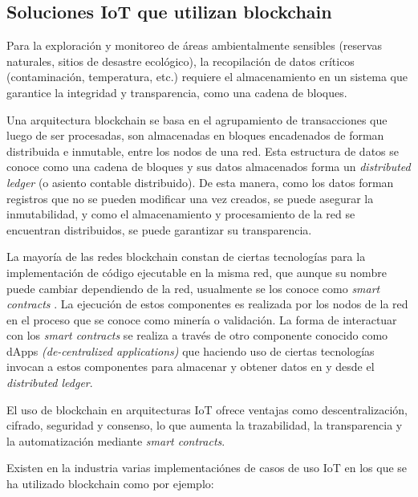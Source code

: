 \subsection{Soluciones IoT que utilizan blockchain}


Para la exploración y monitoreo de áreas ambientalmente sensibles (reservas naturales, sitios de desastre ecológico), la recopilación de datos críticos (contaminación, temperatura, etc.) requiere el almacenamiento en un sistema que garantice la integridad y transparencia, como una cadena de bloques.

Una arquitectura blockchain \cite{blockchain} se basa en el agrupamiento de transacciones que luego de ser procesadas, son almacenadas en bloques encadenados de forman distribuida e inmutable, entre los nodos de una red. Esta estructura de datos se conoce como una cadena de bloques y sus datos almacenados forma un \textit{distributed ledger} (o asiento contable distribuido). De esta manera, como los datos forman registros que no se pueden modificar una vez creados, se puede asegurar la inmutabilidad, y como el almacenamiento y procesamiento de la red se encuentran distribuidos, se puede garantizar su transparencia.

La mayoría de las redes blockchain constan de ciertas tecnologías para la implementación de código ejecutable en la misma red, que aunque su nombre puede cambiar dependiendo de la red, usualmente se los conoce como \textit{smart contracts} \citep{smart_contracts}. La ejecución de estos componentes es realizada por los nodos de la red en el proceso que se conoce como minería o validación. La forma de interactuar con los \textit{smart contracts} se realiza a través de otro componente conocido como dApps \textit{(de-centralized applications)} \citep{dapp} que haciendo uso de ciertas tecnologías invocan a estos componentes para almacenar y obtener datos en y desde el \textit{distributed ledger}.

El uso de blockchain en arquitecturas IoT ofrece ventajas como descentralización, cifrado, seguridad y consenso, lo que aumenta la trazabilidad, la transparencia y la automatización mediante \textit{smart contracts}.

Existen en la industria varias implementaciónes de casos de uso IoT en los que se ha utilizado blockchain como por ejemplo:


